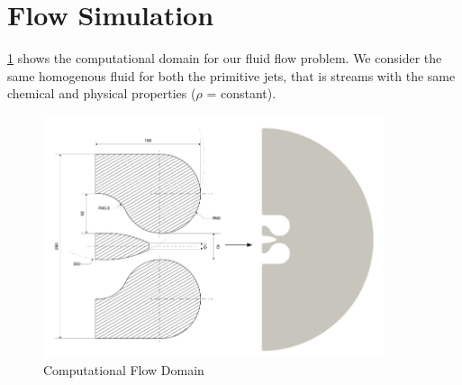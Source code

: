 \section{Flow Simulation}
\ref{fig:Domain} shows the computational domain for our fluid flow problem. We consider the same homogenous fluid for both the primitive jets, that is streams with the same chemical and physical properties ($\rho$ = constant).
\begin{figure}[ht]
  \centering
  \includegraphics[width=10cm]{images/Theory-CFD/Flow Domain.png}
  \caption{Computational Flow Domain}
  \label{fig:Domain}
\end{figure}